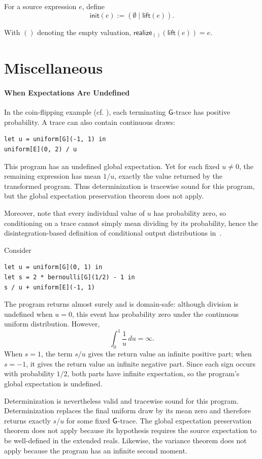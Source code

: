 \begin{definition}[Initialization]
For a source expression $e$, define
\[
  \mathsf{init}(e):=(\emptyset\mid\mathsf{lift}(e)).
\]
\end{definition}
With $()$ denoting the empty valuation,
$\mathsf{realize}_{()}(\mathsf{lift}(e))=e$.

\section{Miscellaneous}\label{sec:appendix-misc}
\paragraph{When Expectations Are Undefined}
\begin{example}
In the coin-flipping example (cf. ), each terminating $\mathsf{G}$-trace has positive probability. A trace can also contain continuous draws:
\begin{lstlisting}
let u = uniform[G](-1, 1) in
uniform[E](0, 2) / u
\end{lstlisting}
This program has an undefined global expectation. Yet for each fixed $u\ne0$,
the remaining expression has mean $1/u$, exactly the value returned by the
transformed program. Thus determinization is tracewise sound for this program, but the global expectation preservation theorem does not apply. 

Moreover, note that every individual value of $u$ has probability zero, so conditioning on a trace cannot simply mean dividing by its probability, hence the disintegration-based definition of conditional output distributions in~.
\end{example}

\begin{example}
Consider
\begin{lstlisting}
let u = uniform[G](0, 1) in
let s = 2 * bernoulli[G](1/2) - 1 in
s / u + uniform[E](-1, 1)
\end{lstlisting}
The program returns almost surely and is domain-safe: although division is
undefined when $u=0$, this event has probability zero under the
continuous uniform distribution. However,
\[
  \int_0^1 \frac{1}{u}\,du=\infty.
\]
When $s=1$, the term $s/u$ gives the return value an infinite positive part;
when $s=-1$, it gives the return value an infinite negative part. Since each
sign occurs with probability $1/2$, both parts have infinite expectation, so
the program's global expectation is undefined.

Determinization is nevertheless valid and tracewise sound for this program. Determinization replaces the final uniform draw by its mean zero and therefore
returns exactly $s/u$ for some fixed $\mathsf{G}$-trace. The global expectation preservation theorem does not
apply because its hypothesis requires the source expectation to be
well-defined in the extended reals. Likewise, the variance theorem does not
apply because the program has an infinite second moment.
\end{example}

